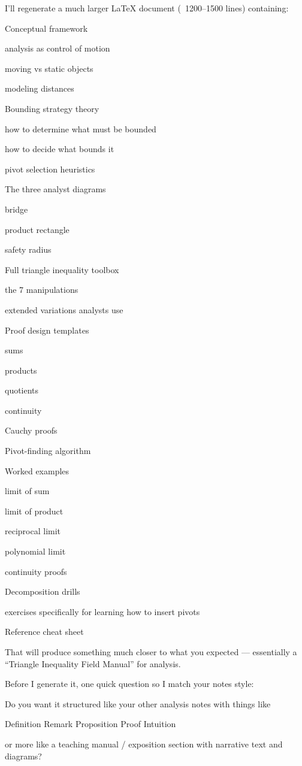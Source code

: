 I'll regenerate a much larger LaTeX document (~1200–1500 lines) containing:

Conceptual framework

analysis as control of motion

moving vs static objects

modeling distances

Bounding strategy theory

how to determine what must be bounded

how to decide what bounds it

pivot selection heuristics

The three analyst diagrams

bridge

product rectangle

safety radius

Full triangle inequality toolbox

the 7 manipulations

extended variations analysts use

Proof design templates

sums

products

quotients

continuity

Cauchy proofs

Pivot-finding algorithm

Worked examples

limit of sum

limit of product

reciprocal limit

polynomial limit

continuity proofs

Decomposition drills

exercises specifically for learning how to insert pivots

Reference cheat sheet

That will produce something much closer to what you expected — essentially a “Triangle Inequality Field Manual” for analysis.

Before I generate it, one quick question so I match your notes style:

Do you want it structured like your other analysis notes with things like

Definition
Remark
Proposition
Proof
Intuition

or more like a teaching manual / exposition section with narrative text and diagrams?

